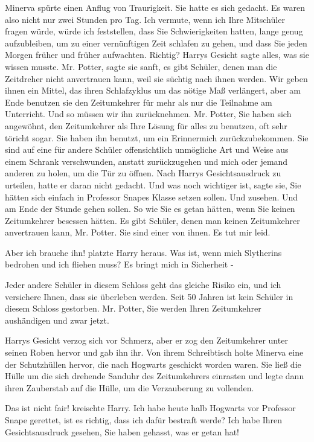 Minerva spürte einen Anflug von Traurigkeit. Sie hatte es sich gedacht. \glqq Es
waren also nicht nur zwei Stunden pro Tag. Ich vermute, wenn ich Ihre Mitschüler
fragen würde, würde ich feststellen, dass Sie Schwierigkeiten hatten, lange
genug aufzubleiben, um zu einer vernünftigen Zeit schlafen zu gehen, und dass
Sie jeden Morgen früher und früher aufwachten. Richtig?\grqq{} Harrys Gesicht
sagte alles, was sie wissen musste. \glqq Mr. Potter\grqq{}, sagte sie sanft,
\glqq es gibt Schüler, denen man die Zeitdreher nicht anvertrauen kann, weil sie
süchtig nach ihnen werden. Wir geben ihnen ein Mittel, das ihren Schlafzyklus um
das nötige Maß verlängert, aber am Ende benutzen sie den Zeitumkehrer für mehr
als nur die Teilnahme am Unterricht. Und so müssen wir ihn zurücknehmen. Mr.
Potter, Sie haben sich angewöhnt, den Zeitumkehrer als Ihre Lösung für alles zu
benutzen, oft sehr töricht sogar. Sie haben ihn benutzt, um ein Erinnermich
zurückzubekommen. Sie sind auf eine für andere Schüler offensichtlich unmögliche
Art und Weise aus einem Schrank verschwunden, anstatt zurückzugehen und mich
oder jemand anderen zu holen, um die Tür zu öffnen.\grqq{} Nach Harrys
Gesichtsausdruck zu urteilen, hatte er daran nicht gedacht. \glqq Und was noch
wichtiger ist\grqq{}, sagte sie, \glqq Sie hätten sich einfach in Professor
Snapes Klasse setzen sollen. Und zusehen. Und am Ende der Stunde gehen sollen.
So wie Sie es getan hätten, wenn Sie keinen Zeitumkehrer besessen hätten. Es
gibt Schüler, denen man keinen Zeitumkehrer anvertrauen kann, Mr. Potter. Sie
sind einer von ihnen. Es tut mir leid.\grqq{}

\glqq Aber ich brauche ihn!\grqq{} platzte Harry heraus. \glqq Was ist, wenn
mich Slytherins bedrohen und ich fliehen muss? Es bringt mich in Sicherheit
-\grqq{}

\glqq Jeder andere Schüler in diesem Schloss geht das gleiche Risiko ein, und
ich versichere Ihnen, dass sie überleben werden. Seit 50 Jahren ist kein Schüler
in diesem Schloss gestorben. Mr. Potter, Sie werden Ihren Zeitumkehrer
aushändigen und zwar jetzt.\grqq{}

Harrys Gesicht verzog sich vor Schmerz, aber er zog den Zeitumkehrer unter
seinen Roben hervor und gab ihn ihr. Von ihrem Schreibtisch holte Minerva eine
der Schutzhüllen hervor, die nach Hogwarts geschickt worden waren. Sie ließ die
Hülle um die sich drehende Sanduhr des Zeitumkehrers einrasten und legte dann
ihren Zauberstab auf die Hülle, um die Verzauberung zu vollenden.

\glqq Das ist nicht fair!\grqq{} kreischte Harry. \glqq Ich habe heute halb
Hogwarts vor Professor Snape gerettet, ist es richtig, dass ich dafür bestraft
werde? Ich habe Ihren Gesichtsausdruck gesehen, Sie haben gehasst, was er getan
hat!\grqq{}

